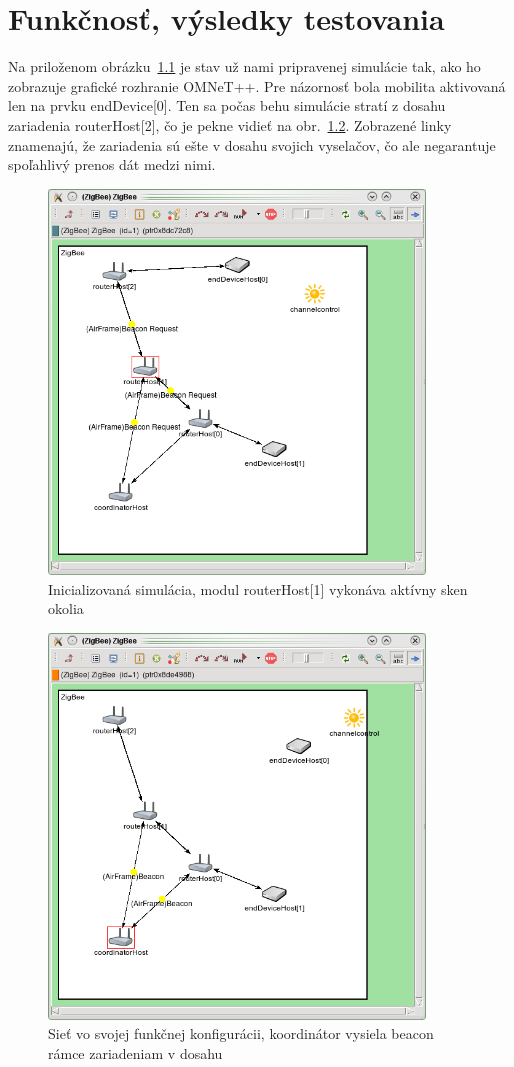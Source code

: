 \chapter{Funkčnosť, výsledky testovania}

\indent\indent Na priloženom obrázku~\ref{fig:screen_init} je stav už nami pripravenej simulácie tak, ako ho zobrazuje grafické rozhranie OMNeT++. Pre názornosť bola mobilita aktivovaná len na prvku endDevice[0]. Ten sa počas behu simulácie stratí z dosahu zariadenia routerHost[2], čo je pekne vidieť na obr.~\ref{fig:screen_beacons}. Zobrazené linky znamenajú, že zariadenia sú ešte v dosahu svojich vyselačov, čo ale negarantuje spoľahlivý prenos dát medzi nimi.
\begin{figure}[htbp]
\begin{center}
\includegraphics[width=100mm]{figures/screen_init}
\caption{Inicializovaná simulácia, modul routerHost[1] vykonáva aktívny sken okolia}
\label{fig:screen_init}
\end{center}
\end{figure}
\begin{figure}[htbp]
\begin{center}
\includegraphics[width=100mm]{figures/screen_beacons}
\caption{Sieť vo svojej funkčnej konfigurácii, koordinátor vysiela beacon rámce zariadeniam v dosahu}
\label{fig:screen_beacons}
\end{center}
\end{figure}
